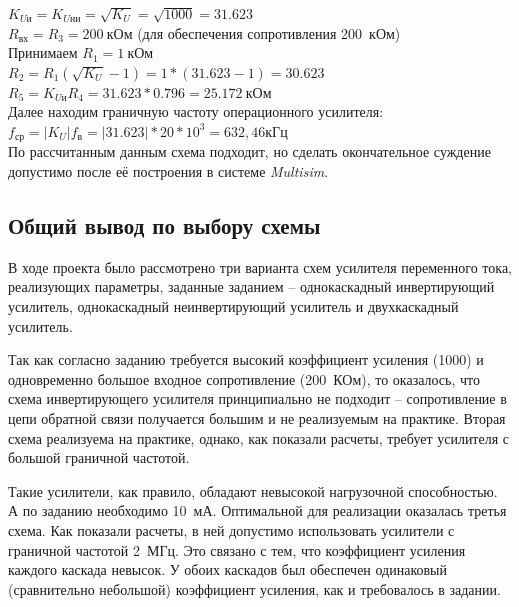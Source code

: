 $ K_{Uи} = K_{Uни} = \sqrt{K_{U}} = \sqrt{1000} = 31.623 $\\

$ R_{вх} = R_3 = 200~кОм $ (для обеспечения сопротивления 200~кОм)\\

Принимаем $ R_1 = 1~кОм $\\

$ R_2 = R_1 (\sqrt{K_U} - 1) = 1 * (31.623 - 1) = 30.623 $\\

$ R_5 = K_{Uи} R_4 = 31.623 * 0.796 = 25.172~кОм $\\

Далее находим граничную частоту операционного усилителя:\\

$ f_{ср} = |K_U| f_в = |31.623| * 20 * 10^3 = 632,46 кГц $\\

По рассчитанным данным схема подходит, 
но сделать окончательное суждение допустимо 
после её построения в системе \textit{Multisim}.

\subsection*{Общий вывод по выбору схемы}

В ходе проекта было рассмотрено 
три варианта схем усилителя переменного тока, 
реализующих параметры, заданные заданием – 
однокаскадный инвертирующий усилитель, 
однокаскадный неинвертирующий усилитель и 
двухкаскадный усилитель.

Так как согласно заданию 
требуется высокий коэффициент усиления (1000)
и одновременно большое входное сопротивление (200~КОм), 
то оказалось, что схема инвертирующего усилителя 
принципиально не подходит – 
сопротивление в цепи обратной связи получается большим
и не реализуемым на практике.
Вторая схема реализуема на практике, однако, 
как показали расчеты, требует усилителя 
с большой граничной частотой.

Такие усилители, как правило, 
обладают невысокой нагрузочной способностью. 
А по заданию необходимо 10~мА.
Оптимальной для реализации оказалась третья схема. 
Как показали расчеты, в ней допустимо использовать
усилители  с граничной частотой 2~МГц. 
Это связано с тем, что коэффициент усиления 
каждого каскада невысок. 
У обоих каскадов был обеспечен одинаковый 
(сравнительно небольшой) коэффициент усиления,
как и требовалось в задании.



